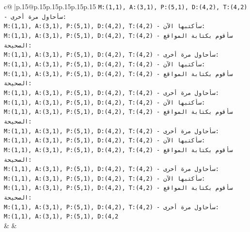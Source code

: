 \documentclass{article}
\begin{document}
{\begin{supertabular}{c@{$\;$}|p{.15\linewidth}@{}p{.15\linewidth}p{.15\linewidth}p{.15\linewidth}p{.15\linewidth}p{.15\linewidth}}
{{{\texttt{M:(1,1), A:(3,1), P:(5,1), D:(4,2), T:(4,2) {-} سأحاول مرة أخرى:} \\
\texttt{M:(1,1), A:(3,1), P:(5,1), D:(4,2), T:(4,2) {-} سأكتبها الآن:} \\
\texttt{M:(1,1), A:(3,1), P:(5,1), D:(4,2), T:(4,2) {-} سأقوم بكتابة المواقع الصحيحة:} \\
\texttt{M:(1,1), A:(3,1), P:(5,1), D:(4,2), T:(4,2) {-} سأحاول مرة أخرى:} \\
\texttt{M:(1,1), A:(3,1), P:(5,1), D:(4,2), T:(4,2) {-} سأكتبها الآن:} \\
\texttt{M:(1,1), A:(3,1), P:(5,1), D:(4,2), T:(4,2) {-} سأقوم بكتابة المواقع الصحيحة:} \\
\texttt{M:(1,1), A:(3,1), P:(5,1), D:(4,2), T:(4,2) {-} سأحاول مرة أخرى:} \\
\texttt{M:(1,1), A:(3,1), P:(5,1), D:(4,2), T:(4,2) {-} سأكتبها الآن:} \\
\texttt{M:(1,1), A:(3,1), P:(5,1), D:(4,2), T:(4,2) {-} سأقوم بكتابة المواقع الصحيحة:} \\
\texttt{M:(1,1), A:(3,1), P:(5,1), D:(4,2), T:(4,2) {-} سأحاول مرة أخرى:} \\
\texttt{M:(1,1), A:(3,1), P:(5,1), D:(4,2), T:(4,2) {-} سأكتبها الآن:} \\
\texttt{M:(1,1), A:(3,1), P:(5,1), D:(4,2), T:(4,2) {-} سأقوم بكتابة المواقع الصحيحة:} \\
\texttt{M:(1,1), A:(3,1), P:(5,1), D:(4,2), T:(4,2) {-} سأحاول مرة أخرى:} \\
\texttt{M:(1,1), A:(3,1), P:(5,1), D:(4,2), T:(4,2) {-} سأكتبها الآن:} \\
\texttt{M:(1,1), A:(3,1), P:(5,1), D:(4,2), T:(4,2) {-} سأقوم بكتابة المواقع الصحيحة:} \\
\texttt{M:(1,1), A:(3,1), P:(5,1), D:(4,2), T:(4,2) {-} سأحاول مرة أخرى:} \\
\texttt{M:(1,1), A:(3,1), P:(5,1), D:(4,2} \\
            }
        }
    }
    & & \\ \\


\end{supertabular}}
\end{document}
